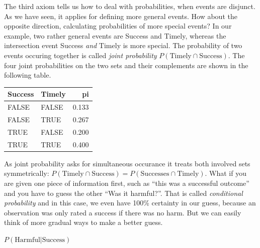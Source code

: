 \documentclass[]{svmono}
\newenvironment{Shaded}{\begin{snugshade}}{\end{snugshade}}
\newcommand{\KeywordTok}[1]{\textcolor[rgb]{0.13,0.29,0.53}{\textbf{#1}}}
\newcommand{\DataTypeTok}[1]{\textcolor[rgb]{0.13,0.29,0.53}{#1}}
\newcommand{\StringTok}[1]{\textcolor[rgb]{0.31,0.60,0.02}{#1}}
\newcommand{\OperatorTok}[1]{\textcolor[rgb]{0.81,0.36,0.00}{\textbf{#1}}}
\newcommand{\NormalTok}[1]{#1}
\begin{document}
The third axiom tells us how to deal with probabilities, when events are
disjunct. As we have seen, it applies for defining more general events.
How about the opposite direction, calculating probabilities of more
special events? In our example, two rather general events are Success
and Timely, whereas the intersection event Success \emph{and} Timely is
more special. The probability of two events occuring together is called
\emph{joint probability} \(P(\textrm{Timely} \cap \textrm{Success})\).
The four joint probabilities on the two sets and their complements are
shown in the following table.

\begin{Shaded}
\end{Shaded}

\begin{tabular}{l|l|r}
\hline
Success & Timely & pi\\
\hline
FALSE & FALSE & 0.133\\
\hline
FALSE & TRUE & 0.267\\
\hline
TRUE & FALSE & 0.200\\
\hline
TRUE & TRUE & 0.400\\
\hline
\end{tabular}

As joint probability asks for simultaneous occurance it treats both
involved sets symmetrically:
\(P(\textrm{Timely} \cap \textrm{Success}) = P(\textrm{Successes} \cap \textrm{Timely})\).
What if you are given one piece of information first, such as ``this was
a successful outcome'' and you have to guess the other ``Was it
harmful?''. That is called \emph{conditional probability} and in this
case, we even have 100\% certainty in our guess, because an observation
was only rated a success if there was no harm. But we can easily think
of more gradual ways to make a better guess.

\(P(\textrm{Harmful}|\textrm{Success})\)

\begin{Shaded}
\end{Shaded}
\end{document}
